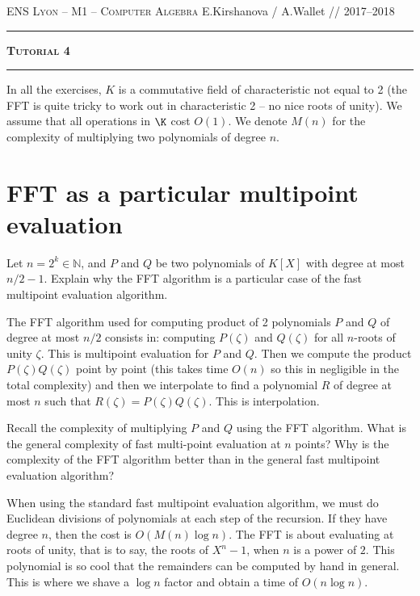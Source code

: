 \documentclass[11pt]{exam}
\theoremstyle{definition}
\begin{document}
{\noindent
   \textsc{ENS Lyon --  M1 -- Computer Algebra}
   \hfill {E.Kirshanova / A.Wallet // 2017--2018\\
  }
  \hrule
  \begin{center}
    {\Large\textbf{
   \textsc{Tutorial 4}
    } } 
  \end{center}
  \hrule \vspace{5mm}

\thispagestyle{empty}

\vspace{0.2cm}


In all the exercises, $K$ is a commutative field of
characteristic not equal to 2 (the FFT is quite tricky to work
  out in characteristic 2 -- no nice roots of unity). We
assume that all operations in $\K$ cost $O(1)$. We denote $M(n)$ for
the complexity of multiplying two polynomials of degree $n$.
\vspace{-1mm}

\section{FFT as a particular multipoint evaluation}
\begin{questions}
\question Let $n = 2^k \in \mathbb{N}$, and $P$ and $Q$ be two polynomials of $K[X]$ with degree at most $n/2-1$. Explain why the FFT algorithm is a particular case of the fast multipoint evaluation algorithm. 
    
\begin{solution}
The FFT algorithm used for computing product of 2 polynomials $P$ and $Q$ of degree at most $n/2$ consists in: computing $P(\zeta)$ and $Q(\zeta)$ for all $n$-roots of unity $\zeta$. This is multipoint evaluation for $P$ and $Q$. Then we compute the product $P(\zeta)Q(\zeta)$ point by point (this takes time $O(n)$ so this in negligible in the total complexity) and then we interpolate to find a polynomial $R$ of degree at most $n$ such that $R(\zeta) = P(\zeta) Q(\zeta)$. This is interpolation.  
\end{solution}


  \question Recall the complexity of multiplying $P$ and $Q$ using the FFT algorithm. What is the general complexity of fast multi-point evaluation at $n$ points? Why is the complexity of the FFT algorithm better than in the general fast
  multipoint evaluation algorithm? 
  
  \begin{solution}
    When using the standard fast multipoint evaluation algorithm, we must do Euclidean divisions of polynomials at each step of the recursion. If they have degree $n$, then the cost is $O(M(n)\log n)$. The FFT is about evaluating at roots of unity, that is to say, the roots of $X^n-1$, when $n$ is a power of $2$. This polynomial is so cool that the remainders can be computed by hand in general. This is where we shave a $\log n$ factor and obtain a time of $O(n\log n)$.


\end{solution}
\end{questions}}
\end{document}
